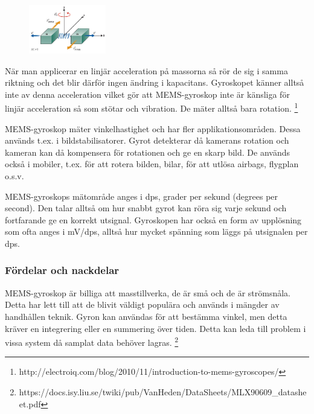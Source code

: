 \documentclass[a4paper,12pt,fleqn]{article}
\begin{document}
\begin{figure}[h]
\label{fig:angular}
\caption{}
\includegraphics[width=0.3\textwidth]
{angularv.png}
\end{figure}

När man applicerar en linjär acceleration på massorna så rör de sig i samma riktning och det blir därför ingen ändring i kapacitans. Gyroskopet känner alltså inte av denna acceleration vilket gör att MEMS-gyroskop inte är känsliga för linjär acceleration så som stötar och vibration. De mäter alltså bara rotation.
\footnote{http://electroiq.com/blog/2010/11/introduction-to-mems-gyroscopes/}


MEMS-gyroskop mäter vinkelhastighet och har fler applikationsområden. Dessa används t.ex. i bildstabilisatorer. Gyrot detekterar då kamerans rotation och kameran kan då kompensera för rotationen och ge en skarp bild. De används också i mobiler, t.ex. för att rotera bilden, bilar, för att utlösa airbags, flygplan o.s.v.

MEMS-gyroskops mätområde anges i dps, grader per sekund (degrees per second). Den talar alltså om hur snabbt gyrot kan röra sig varje sekund och fortfarande ge en korrekt utsignal. Gyroskopen har också en form av upplösning som ofta anges i mV/dps, alltså hur mycket spänning som läggs på utsignalen per dps.

\subsubsection{Fördelar och nackdelar}
MEMS-gyroskop är billiga att masstillverka, de är små och de är strömsnåla. Detta har lett till att de blivit väldigt populära och används i mängder av handhållen teknik.
Gyron kan användas för att bestämma vinkel, men detta kräver en integrering eller en summering över tiden. Detta kan leda till problem i vissa system då samplat data behöver lagras.
\footnote{https://docs.isy.liu.se/twiki/pub/VanHeden/DataSheets/MLX90609_datasheet.pdf}
\end{document}
